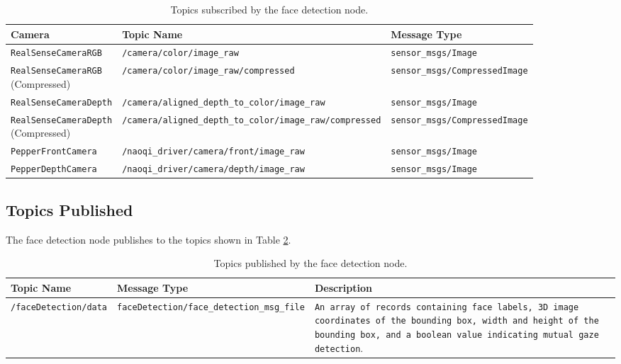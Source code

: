 \documentclass{CSSRforAfrica}
\begin{document}
{\begin{table}[!h]
	\centering
	{\fontsize{7.0}{9.0}\selectfont %
		\begin{tabularx}{\linewidth}{| l | l | X |}
			\hline
			\rowcolor{blue!20}
			\textbf{Camera} & \textbf{Topic Name} & \textbf{Message Type} \\
			\hline
			\texttt{RealSenseCameraRGB} & \texttt{/camera/color/image\_raw} & \texttt{sensor\_msgs/Image} \\
			\hline
			\makecell[l]{\texttt{RealSenseCameraRGB} \\ (Compressed)} & \texttt{/camera/color/image\_raw/compressed} & \texttt{sensor\_msgs/CompressedImage} \\
			\hline
			\texttt{RealSenseCameraDepth} & \texttt{/camera/aligned\_depth\_to\_color/image\_raw} & \texttt{sensor\_msgs/Image} \\
			\hline
			\makecell[l]{\texttt{RealSenseCameraDepth} \\ (Compressed)} & \texttt{/camera/aligned\_depth\_to\_color/image\_raw/compressed} & \texttt{sensor\_msgs/CompressedImage} \\
			\hline
			\texttt{PepperFrontCamera} & \texttt{/naoqi\_driver/camera/front/image\_raw} & \texttt{sensor\_msgs/Image} \\
			\hline
			\texttt{PepperDepthCamera} & \texttt{/naoqi\_driver/camera/depth/image\_raw} & \texttt{sensor\_msgs/Image} \\
			\hline
		\end{tabularx}
	}
	\caption{Topics subscribed by the face detection node.}
	\label{Table: topic subscribed}
\end{table}

\subsection*{Topics Published}
The face detection node publishes to the topics shown in Table \ref{Table: topics published}.

\begin{table}[!h]
	\centering
	{\fontsize{8.5}{9.5}\selectfont
		\begin{tabularx}{\linewidth}{| l | l | X |}
			\hline
			\rowcolor{blue!20} %
			\textbf{Topic Name} & \textbf{Message Type} & \textbf{Description} \\
			\hline
			\texttt{/faceDetection/data}  & \texttt{faceDetection/face\_detection\_msg\_file} & \texttt{An array of records containing face labels, 3D image coordinates of the bounding box, width and height of the bounding box, and a boolean value indicating mutual gaze detection}. \\
			\hline
		\end{tabularx}
	}
	\caption{Topics published by the face detection node.}
	\label{Table: topics published}
\end{table}


}
\end{document}
